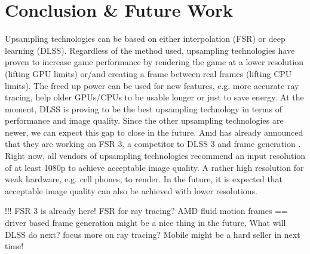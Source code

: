\documentclass[letterpaper, 10 pt, conference]{ieeeconf}  %
\begin{document}
\section{Conclusion \& Future Work}
\label{Sec:ConcFuture}

Upsampling technologies can be based on either interpolation (FSR) or deep learning (DLSS).
Regardless of the method used, upsampling technologies have proven to increase game performance by rendering the game at a lower resolution (lifting GPU limits) or/and creating a frame between real frames (lifting CPU limits).
The freed up power can be used for new features, e.g. more accurate ray tracing, help older GPUs/CPUs to be usable longer or just to save energy.
At the moment, DLSS is proving to be the best upsampling technology in terms of performance and image quality.
Since the other upsampling technologies are newer, we can expect this gap to close in the future.
Amd has already announced that they are working on FSR 3, a competitor to DLSS 3 and frame generation \cite{fsr3}.
Right now, all vendors of upsampling technologies recommend an input resolution of at least 1080p to achieve acceptable image quality.
A rather high resolution for weak hardware, e.g. cell phones, to render.
In the future, it is expected that acceptable image quality can also be achieved with lower resolutions.

!!! FSR 3 is already here! FSR for ray tracing? AMD fluid motion frames == driver based frame generation might be a nice thing in the future, What will DLSS do next? focus more on ray tracing? Mobile might be a hard seller in next time!








\end{document}
